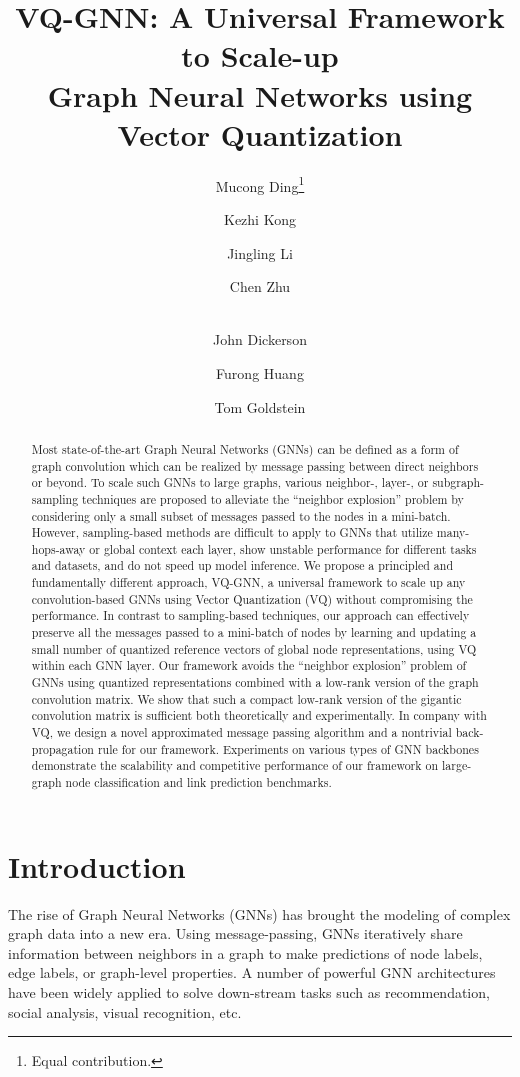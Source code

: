 \documentclass{article}
\title{
    VQ-GNN: A Universal Framework to Scale-up\\
    Graph Neural Networks using Vector Quantization
}
\author[ ]{Mucong Ding\thanks{Equal contribution.} }
\author[ ]{Kezhi Kong\protect\footnotemark[1] }
\author[ ]{Jingling Li}
\author[ ]{Chen Zhu}
\author[ ]{\\John Dickerson}
\author[ ]{Furong Huang}
\author[ ]{Tom Goldstein}
\affil[ ]{Department of Computer Science, University of Maryland}
\affil[ ]{\textit {\{mcding, kong, jingling, chenzhu, john, furongh, tomg\}@cs.umd.edu}}
\begin{document}
\maketitle



\begin{abstract}
  Most state-of-the-art Graph Neural Networks (GNNs) can be defined as a form of graph convolution which can be realized by message passing between direct neighbors or beyond. To scale such GNNs to large graphs, various neighbor-, layer-, or subgraph-sampling techniques are proposed to alleviate the ``neighbor explosion'' problem by considering only a small subset of messages passed to the nodes in a mini-batch. However, sampling-based methods are difficult to apply to GNNs that utilize many-hops-away or global context each layer, show unstable performance for different tasks and datasets, and do not speed up model inference. We propose a principled and fundamentally different approach, VQ-GNN, a universal framework to scale up any convolution-based GNNs using Vector Quantization (VQ) without compromising the performance. In contrast to sampling-based techniques, our approach can effectively preserve all the messages passed to a mini-batch of nodes by learning and updating a small number of quantized reference vectors of global node representations, using VQ within each GNN layer. Our framework avoids the ``neighbor explosion'' problem of GNNs using quantized representations combined with a low-rank version of the graph convolution matrix. We show that such a compact low-rank version of the gigantic convolution matrix is sufficient both theoretically and experimentally. In company with VQ, we design a novel approximated message passing algorithm and a nontrivial back-propagation rule for our framework. Experiments on various types of GNN backbones demonstrate the scalability and competitive performance of our framework on large-graph node classification and link prediction benchmarks.
\end{abstract}



\section{Introduction}
\label{sec:intro}




The rise of Graph Neural Networks (GNNs) has brought the modeling of complex graph data into a new era. Using message-passing, GNNs iteratively share information between neighbors in a graph to make predictions of node labels, edge labels, or graph-level properties. A number of powerful GNN architectures~\citep{kipf2016semi,hamilton2017inductive,velivckovic2017graph,xu2018powerful} have been widely applied to solve down-stream tasks such as recommendation, social analysis, visual recognition, etc.
\end{document}
